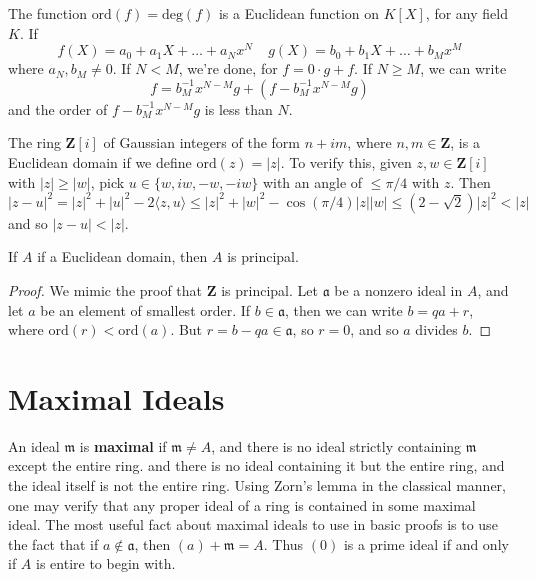 \begin{example}
    The function $\text{ord}(f) = \text{deg}(f)$ is a Euclidean function on $K[X]$, for any field $K$. If
    \[ f(X) = a_0 + a_1X + \dots + a_Nx^N\ \ \ \ \ g(X) = b_0 + b_1X + \dots + b_Mx^M \]
    where $a_N, b_M \neq 0$. If $N < M$, we're done, for $f = 0 \cdot g + f$. If $N \geq M$, we can write
    \[ f = b_M^{-1}x^{N-M}g + (f - b_M^{-1}x^{N-M}g) \]
    and the order of $f - b_M^{-1}x^{N-M}g$ is less than $N$.
\end{example}

\begin{example}
    The ring $\mathbf{Z}[i]$ of Gaussian integers of the form $n + im$, where $n,m \in \mathbf{Z}$, is a Euclidean domain if we define $\text{ord}(z) = |z|$. To verify this, given $z,w \in \mathbf{Z}[i]$ with $|z| \geq |w|$, pick $u \in \{ w, iw, -w, -iw \}$ with an angle of $\leq \pi/4$ with $z$. Then
    \[ |z - u|^2 = |z|^2 + |u|^2 - 2 \langle z, u \rangle \leq |z|^2 + |w|^2 - \cos(\pi/4) |z||w| \leq (2 - \sqrt{2}) |z|^2 < |z| \]
    and so $|z - u| < |z|$.
\end{example}

\begin{theorem}
    If $A$ if a Euclidean domain, then $A$ is principal.
\end{theorem}
\begin{proof}
    We mimic the proof that $\mathbf{Z}$ is principal. Let $\mathfrak{a}$ be a nonzero ideal in $A$, and let $a$ be an element of smallest order. If $b \in \mathfrak{a}$, then we can write $b = qa + r$, where $\text{ord}(r) < \text{ord}(a)$. But $r = b - qa \in \mathfrak{a}$, so $r = 0$, and so $a$ divides $b$.
\end{proof}

\section{Maximal Ideals}

An ideal $\mathfrak{m}$ is {\bf maximal} if $\mathfrak{m} \neq A$, and there is no ideal strictly containing $\mathfrak{m}$ except the entire ring. and there is no ideal containing it but the entire ring, and the ideal itself is not the entire ring. Using Zorn's lemma in the classical manner, one may verify that any proper ideal of a ring is contained in some maximal ideal. The most useful fact about maximal ideals to use in basic proofs is to use the fact that if $a \not \in \mathfrak{a}$, then $(a) + \mathfrak{m} = A$. Thus $(0)$ is a prime ideal if and only if $A$ is entire to begin with.

